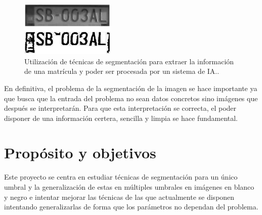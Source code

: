 \begin{figure}
\centering
	\includegraphics[width=0.4\textwidth]{img/matricula.eps}
	\caption{Utilización de técnicas de segmentación para extraer la información de una matrícula y poder ser procesada por un sistema de IA.\cite{lib:matricula}.}
	\label{img:matricula}
\end{figure}

En definitiva, el problema de la segmentación de la imagen se hace importante ya que busca que la entrada del problema no sean datos concretos sino imágenes que después se interpretarán. Para que esta interpretación se correcta, el poder disponer de una información certera, sencilla y limpia se hace fundamental.




\section{Propósito y objetivos}\label{sec:objetivos}

Este proyecto se centra en estudiar técnicas de segmentación para un único umbral y la generalización de estas en múltiples umbrales en imágenes en blanco y negro e intentar mejorar las técnicas de las que actualmente se disponen intentando generalizarlas de forma que los parámetros no dependan del problema. 

